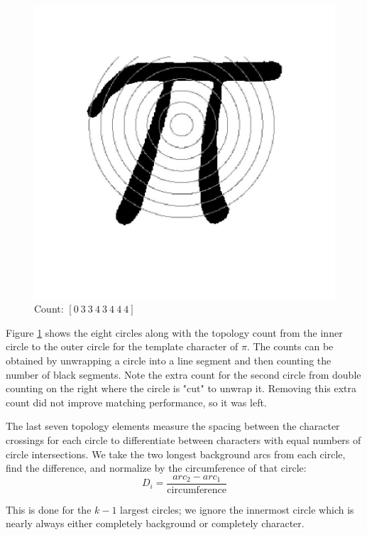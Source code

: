 \documentclass[journal]{IEEEtran}
\begin{document}
\begin{figure}[!t]
    \centering
    \includegraphics[width=\columnwidth]{pi_hu}
    \caption{Count: $[0\ 3\ 3\ 4\ 3\ 4\ 4\ 4]$}
    \label{fig:pi_hu}
\end{figure}

Figure \ref{fig:pi_hu} shows the eight circles along with the topology count from the inner circle to the outer circle for the template character of $\pi$. The counts can be obtained by unwrapping a circle into a line segment and then counting the number of black segments. Note the extra count for the second circle from double counting on the right where the circle is "cut" to unwrap it. Removing this extra count did not improve matching performance, so it was left.

The last seven topology elements measure the spacing between the character crossings for each circle to differentiate between characters with equal numbers of circle intersections. We take the two longest background arcs from each circle, find the difference, and normalize by the circumference of that circle:
\begin{equation} \label{eq:arc_ratio}
    D_i = \frac{arc_2-arc_1}{\text{circumference}}
\end{equation}

This is done for the $k-1$ largest circles; we ignore the innermost circle which is nearly always either completely background or completely character.
\end{document}
